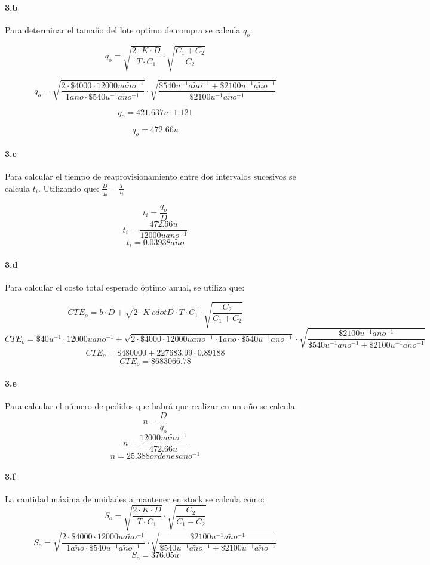 \documentclass{article}
\def \anio {a\tilde{n}o}
\begin{document}
  \paragraph{3.b}
  Para determinar el tama\~no del lote optimo de compra se calcula $ q_o $:
  
  $$ q_o = \sqrt{\frac{2 \cdot K \cdot D}{T \cdot C_1}} \cdot \sqrt{\frac{C_1 + C_2}{C_2}} $$
  
  $$q_o = \sqrt{\frac{2 \cdot \$4000  \cdot 12000 u \anio^{-1}}{1 \anio \cdot \$540 u^{-1}\anio^{-1}}} \cdot \sqrt{\frac{\$540 u^{-1}\anio^{-1} + \$2100 u^{-1}\anio^{-1}}{\$2100 u^{-1}\anio^{-1}}} $$

  $$q_o = 421.637 u \cdot 1.121 $$

  $$ \boxed{ q_o = 472.66 u } $$

  \paragraph{3.c}
  Para calcular el tiempo de reaprovisionamiento entre dos intervalos sucesivos se calcula $t_i$. Utilizando que: $ \frac{D}{q_o} = \frac{T}{t_i} $

  $$t_i = \frac{q_o}{D} $$
  $$t_i = \frac{472.66 u}{12000 u \anio^{-1}} $$
  $$\boxed{t_i = 0.03938 \anio} $$

  \paragraph{3.d}
  Para calcular el costo total esperado \'optimo anual, se utiliza que:

  $$CTE_o = b \cdot D + \sqrt{2 \cdot K \ cdot D \cdot T \cdot C_1} \cdot \sqrt{\frac{C_2}{C_1 + C_2}} $$
  $$CTE_o = \$40 u^{-1} \cdot 12000 u \anio^{-1} + \sqrt{2 \cdot \$4000 \cdot 12000 u \anio^{-1} \cdot 1 \anio \cdot \$540 u^{-1}\anio^{-1} } \cdot \sqrt{\frac{\$2100 u^{-1}\anio^{-1}}{\$540 u^{-1}\anio^{-1} + \$2100 u^{-1}\anio^{-1}}} $$
  $$CTE_o = \$480000 + 227683.99 \cdot 0.89188 $$ 
  $$\boxed{CTE_o = \$683066.78}$$

  \paragraph{3.e}
  Para calcular el n\'umero de pedidos que habr\'a que realizar en un a\~no se calcula:
  $$n = \frac{D}{q_o} $$
  $$n = \frac{12000 u \anio^{-1}}{472.66 u} $$
  $$\boxed{n = 25.388 ordenes \anio^{-1}} $$

  \paragraph{3.f}
  La cantidad m\'axima de unidades a mantener en stock se calcula como:
  $$S_o = \sqrt{\frac{2 \cdot K \cdot D}{T \cdot C_1}} \cdot \sqrt{\frac{C_2}{C_1 + C_2}} $$
  $$S_o = \sqrt{\frac{2 \cdot \$4000 \cdot 12000 u \anio^{-1}}{1 \anio \cdot \$540 u^{-1}\anio^{-1} }} \cdot \sqrt{\frac{\$2100 u^{-1}\anio^{-1}}{\$540 u^{-1}\anio^{-1} + \$2100 u^{-1}\anio^{-1}}} $$
  $$\boxed{S_o = 376.05 u} $$
\end{document}

